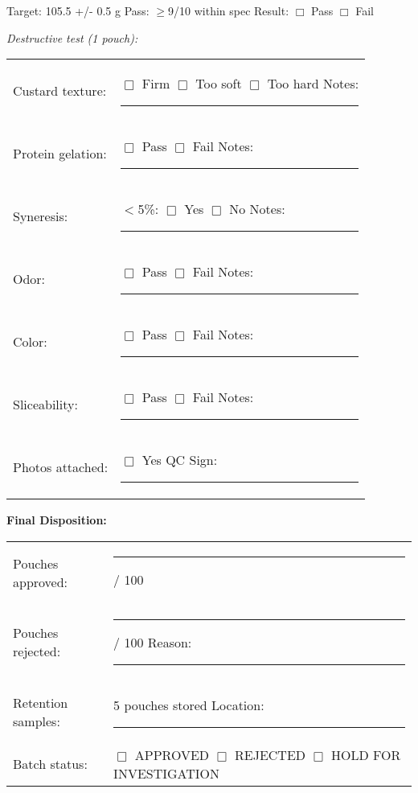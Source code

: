 \noindent Target: 105.5 +/- 0.5 g \hspace{2cm} Pass: $\ge$9/10 within spec \hspace{2cm} Result: $\Box$ Pass $\Box$ Fail

\vspace{0.5em}

\noindent\textit{Destructive test (1 pouch):}

\begin{tabular}{@{}lp{8cm}@{}}
Custard texture: & $\Box$ Firm $\Box$ Too soft $\Box$ Too hard \hspace{1cm} Notes: \rule{4cm}{0.4pt} \\
Protein gelation: & $\Box$ Pass $\Box$ Fail \hspace{2cm} Notes: \rule{5cm}{0.4pt} \\
Syneresis: & $<$5\%: $\Box$ Yes $\Box$ No \hspace{2cm} Notes: \rule{5cm}{0.4pt} \\
Odor: & $\Box$ Pass $\Box$ Fail \hspace{2cm} Notes: \rule{5cm}{0.4pt} \\
Color: & $\Box$ Pass $\Box$ Fail \hspace{2cm} Notes: \rule{5cm}{0.4pt} \\
Sliceability: & $\Box$ Pass $\Box$ Fail \hspace{2cm} Notes: \rule{5cm}{0.4pt} \\
Photos attached: & $\Box$ Yes \hspace{3cm} QC Sign: \rule{3cm}{0.4pt} \\
\end{tabular}

\vspace{1em}

\noindent\textbf{Final Disposition:}

\begin{tabular}{@{}lp{8cm}@{}}
Pouches approved: & \rule{3cm}{0.4pt} / 100 \\
Pouches rejected: & \rule{3cm}{0.4pt} / 100 \hspace{2cm} Reason: \rule{5cm}{0.4pt} \\
Retention samples: & 5 pouches stored \hspace{2cm} Location: \rule{4cm}{0.4pt} \\
Batch status: & $\Box$ APPROVED $\Box$ REJECTED $\Box$ HOLD FOR INVESTIGATION \\
\end{tabular}

\vspace{1em}

